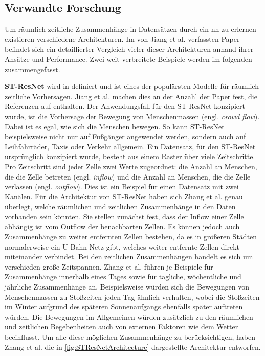 \subsection{Verwandte Forschung}
\label{sec:VerwandteForschung}

Um räumlich-zeitliche Zusammenhänge in Datensätzen durch ein \acrshort{nn} zu erlernen existieren verschiedene Architekturen.
Im von Jiang et al. verfassten Paper \cite{DLTraff} befindet sich ein detaillierter Vergleich vieler dieser Architekturen anhand ihrer Ansätze und Performance.
Zwei weit verbreitete Beispiele werden im folgenden zusammengefasst.

\textbf{ST-ResNet} wird in \cite{STResNetOriginal} definiert und ist eines der populärsten Modelle für räumlich-zeitliche Vorhersagen.
Jiang et al. machen dies an der Anzahl der Paper fest, die Referenzen auf \cite{STResNetOriginal} enthalten.
Der Anwendungsfall für den ST-ResNet konzipiert wurde, ist die Vorhersage der Bewegung von Menschenmassen (engl. \emph{crowd flow}).
Dabei ist es egal, wie sich die Menschen bewegen.
So kann ST-ResNet beispielsweise nicht nur auf Fußgänger angewendet werden, sondern auch auf Leihfahrräder, Taxis oder Verkehr allgemein.
Ein Datensatz, für den ST-ResNet ursprünglich konzipiert wurde, besteht aus einem Raster über viele Zeitschritte.
Pro Zeitschritt sind jeder Zelle zwei Werte zugeordnet: die Anzahl an Menschen, die die Zelle betreten (engl. \emph{inflow}) und die Anzahl an Menschen, die die Zelle verlassen (engl. \emph{outflow}).
Dies ist ein Beispiel für einen Datensatz mit zwei Kanälen.
Für die Architektur von ST-ResNet haben sich Zhang et al. genau überlegt, welche räumlichen und zeitlichen Zusammenhänge in den Daten vorhanden sein könnten.
Sie stellen zunächst fest, dass der Inflow einer Zelle abhängig ist vom Outflow der benachbarten Zellen.
Es können jedoch auch Zusammenhänge zu weiter entfernten Zellen bestehen, da es in größeren Städten normalerweise ein U-Bahn Netz gibt, welches weiter entfernte Zellen direkt miteinander verbindet.
Bei den zeitlichen Zusammenhängen handelt es sich um verschieden große Zeitspannen.
Zhang et al. führen je Beispiele für Zusammenhänge innerhalb eines Tages sowie für tagliche, wöchentliche und jährliche Zusammenhänge an.
Beispielsweise würden sich die Bewegungen von Menschenmassen zu Stoßzeiten jeden Tag ähnlich verhalten, wobei die Stoßzeiten im Winter aufgrund des späteren Sonnenaufgangs ebenfalls später auftreten würden.
Die Bewegungen im Allgemeinen würden zusätzlich zu den räumlichen und zeitlichen Begebenheiten auch von externen Faktoren wie dem Wetter beeinflusst.
Um alle diese möglichen Zusammenhänge zu berücksichtigen, haben Zhang et al. die in \autoref{fig:STResNetArchitecture} dargestellte Architektur entworfen.

